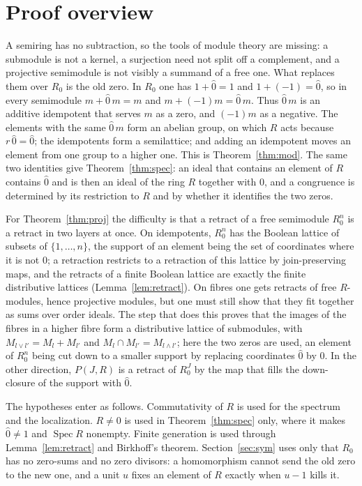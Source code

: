 \documentclass[11pt]{amsart}
\theoremstyle{remark}
\newcommand{\oz}{\widehat{0}}
\DeclareMathOperator{\Spec}{Spec}
\begin{document}
\section{Proof overview}

A semiring has no subtraction, so the tools of module theory are missing: a submodule is not a kernel, a surjection need not split off a complement, and a projective semimodule is not visibly a summand of a free one. What replaces them over $R_0$ is the old zero. In $R_0$ one has $1+\oz=1$ and $1+(-1)=\oz$, so in every semimodule $m+\oz\,m=m$ and $m+(-1)m=\oz\,m$. Thus $\oz\,m$ is an additive idempotent that serves $m$ as a zero, and $(-1)m$ as a negative. The elements with the same $\oz\,m$ form an abelian group, on which $R$ acts because $r\,\oz=\oz$; the idempotents form a semilattice; and adding an idempotent moves an element from one group to a higher one. This is Theorem~\ref{thm:mod}. The same two identities give Theorem~\ref{thm:spec}: an ideal that contains an element of $R$ contains $\oz$ and is then an ideal of the ring $R$ together with $0$, and a congruence is determined by its restriction to $R$ and by whether it identifies the two zeros.

For Theorem~\ref{thm:proj} the difficulty is that a retract of a free semimodule $R_0^n$ is a retract in two layers at once. On idempotents, $R_0^n$ has the Boolean lattice of subsets of $\{1,\dots,n\}$, the support of an element being the set of coordinates where it is not $0$; a retraction restricts to a retraction of this lattice by join-preserving maps, and the retracts of a finite Boolean lattice are exactly the finite distributive lattices (Lemma~\ref{lem:retract}). On fibres one gets retracts of free $R$-modules, hence projective modules, but one must still show that they fit together as sums over order ideals. The step that does this proves that the images of the fibres in a higher fibre form a distributive lattice of submodules, with $M_{l\vee l'}=M_l+M_{l'}$ and $M_l\cap M_{l'}=M_{l\wedge l'}$; here the two zeros are used, an element of $R_0^n$ being cut down to a smaller support by replacing coordinates $\oz$ by $0$. In the other direction, $P(J,R)$ is a retract of $R_0^J$ by the map that fills the down-closure of the support with $\oz$.

The hypotheses enter as follows. Commutativity of $R$ is used for the spectrum and the localization. $R\ne0$ is used in Theorem~\ref{thm:spec} only, where it makes $\oz\ne1$ and $\Spec R$ nonempty. Finite generation is used through Lemma~\ref{lem:retract} and Birkhoff's theorem. Section~\ref{sec:sym} uses only that $R_0$ has no zero-sums and no zero divisors: a homomorphism cannot send the old zero to the new one, and a unit $u$ fixes an element of $R$ exactly when $u-1$ kills it.
\end{document}
